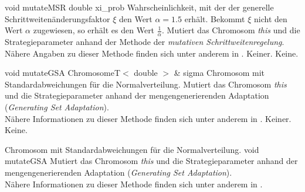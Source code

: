 \documentclass{report}
\begin{document}
\vspace{4ex}

\setNormalInstance
\printMethodWithOneParam
{void}
{mutateMSR}
{double}
{xi\_prob}
{Wahrscheinlichkeit, mit der der generelle 
 Schrittweiten\"anderungsfaktor $\xi$ den Wert $\alpha = 1.5$ erh\"alt. 
 Bekommt $\xi$ nicht den Wert $\alpha$ zugewiesen, so erh\"alt es den
 Wert $\frac{1}{\alpha}$.}
{Mutiert das Chromosom {\em this} und die Strategieparameter anhand der
 Methode der {\em mutativen Schrittweitenregelung}.\\
 N\"ahere Angaben zu dieser Methode finden sich unter anderem
 in \cite{MSR}.}
{Keiner.}
{Keine.}

\newpage

\setNormalInstance
\printMethodWithOneParam
{void}
{mutateGSA}
{ChromosomeT$<$ double $>$ \&}
{sigma}
{Chromosom mit Standardabweichungen f\"ur die Normalverteilung.}
{Mutiert das Chromosom {\em this} und die Strategieparameter anhand der 
 mengengenerierenden Adaptation ({\em Generating Set Adaptation}).\\
 N\"ahere Informationen zu dieser Methode finden sich unter anderem
 in \cite{GSA}.}
{Keiner.}
{Keine.}

\vspace{4ex}

\setNormalInstance
\setCorrectWidthThree{8pt}
{Chromosom mit Standardabweichungen f\"ur die Normalverteilung.}
\printMethodWithParamsSaved
{void}
{}
{mutateGSA}
{Mutiert das Chromosom {\em this} und die Strategieparameter anhand der 
 mengengenerierenden Adaptation ({\em Generating Set Adaptation}).\\
 N\"ahere Informationen zu dieser Methode finden sich unter anderem
 in \cite{GSA}.} 
{}
\setCorrectWidthThree{4pt}
\end{document}
